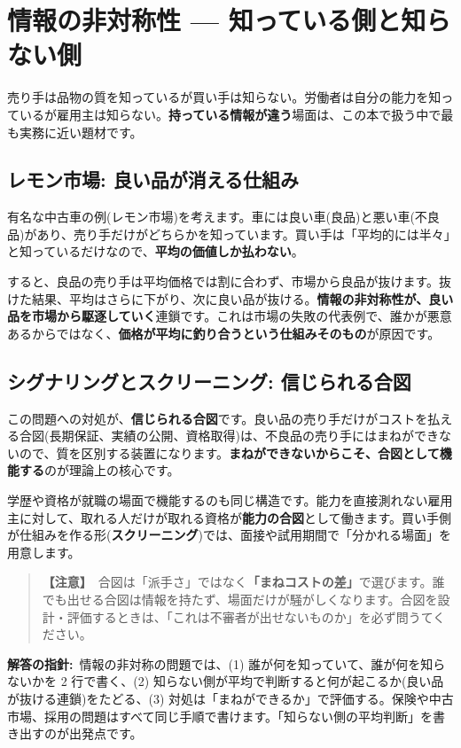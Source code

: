 \documentclass{article}
\begin{document}
\section{情報の非対称性 — 知っている側と知らない側}

売り手は品物の質を知っているが買い手は知らない。労働者は自分の能力を知っているが雇用主は知らない。\textbf{持っている情報が違う}場面は、この本で扱う中で最も実務に近い題材です。

\subsection{レモン市場: 良い品が消える仕組み}

有名な中古車の例(レモン市場)を考えます。車には良い車(良品)と悪い車(不良品)があり、売り手だけがどちらかを知っています。買い手は「平均的には半々」と知っているだけなので、\textbf{平均の価値しか払わない}。

すると、良品の売り手は平均価格では割に合わず、市場から良品が抜けます。抜けた結果、平均はさらに下がり、次に良い品が抜ける。\textbf{情報の非対称性が、良い品を市場から駆逐していく}連鎖です。これは市場の失敗の代表例で、誰かが悪意あるからではなく、\textbf{価格が平均に釣り合うという仕組みそのもの}が原因です。

\subsection{シグナリングとスクリーニング: 信じられる合図}

この問題への対処が、\textbf{信じられる合図}です。良い品の売り手だけがコストを払える合図(長期保証、実績の公開、資格取得)は、不良品の売り手にはまねができないので、質を区別する装置になります。\textbf{まねができないからこそ、合図として機能する}のが理論上の核心です。

学歴や資格が就職の場面で機能するのも同じ構造です。能力を直接測れない雇用主に対して、取れる人だけが取れる資格が\textbf{能力の合図}として働きます。買い手側が仕組みを作る形(\textbf{スクリーニング})では、面接や試用期間で「分かれる場面」を用意します。

\begin{quote}
\textbf{【注意】}\ 合図は「派手さ」ではなく\textbf{「まねコストの差」}で選びます。誰でも出せる合図は情報を持たず、場面だけが騒がしくなります。合図を設計・評価するときは、「これは不審者が出せないものか」を必ず問うてください。
\end{quote}

\textbf{解答の指針:}\ 情報の非対称の問題では、(1) 誰が何を知っていて、誰が何を知らないかを 2 行で書く、(2) 知らない側が平均で判断すると何が起こるか(良い品が抜ける連鎖)をたどる、(3) 対処は「まねができるか」で評価する。保険や中古市場、採用の問題はすべて同じ手順で書けます。「知らない側の平均判断」を書き出すのが出発点です。
\end{document}
